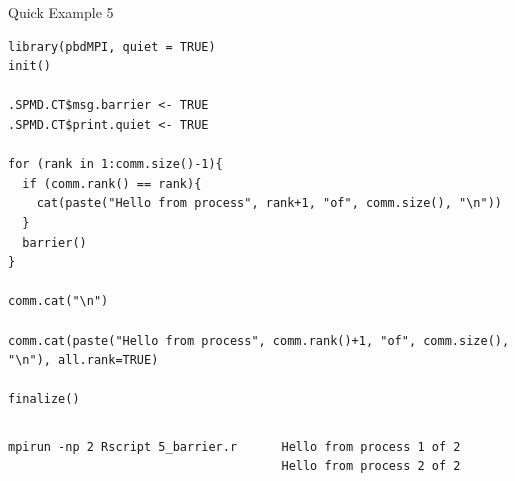 \begin{frame}
  \begin{exampleblock}{Quick Example 5}
\begin{lstlisting}[title=Barrier: 5\_barrier.r]
library(pbdMPI, quiet = TRUE)
init()

.SPMD.CT$msg.barrier <- TRUE
.SPMD.CT$print.quiet <- TRUE

for (rank in 1:comm.size()-1){
  if (comm.rank() == rank){
    cat(paste("Hello from process", rank+1, "of", comm.size(), "\n"))
  }
  barrier()
}

comm.cat("\n")

comm.cat(paste("Hello from process", comm.rank()+1, "of", comm.size(), "\n"), all.rank=TRUE)

finalize()
\end{lstlisting}
  \begin{columns}[t,onlytextwidth]
    \begin{column}{0.58\textwidth}
\begin{lstlisting}[backgroundcolor=\color{white},keywordstyle=\color{black},title=Execute this script via:]
mpirun -np 2 Rscript 5_barrier.r
\end{lstlisting}
    \end{column}
    \hfill
    \begin{column}{0.4\textwidth}
\begin{lstlisting}[title=Sample Output:]
Hello from process 1 of 2 
Hello from process 2 of 2 
\end{lstlisting}
    \end{column}
​  \end{columns}
  \end{exampleblock}
\end{frame}



